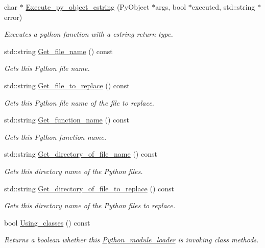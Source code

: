 \begin{DoxyCompactItemize}
char $\ast$ \hyperlink{classjetfuel_1_1inspire_1_1Python__module__loader_a6dcb9763f793360e89da5f3377a945b9}{Execute\+\_\+py\+\_\+object\+\_\+cstring} (Py\+Object $\ast$args, bool $\ast$executed, std\+::string $\ast$error)
\begin{DoxyCompactList}\small\item\em Executes a python function with a cstring return type. \end{DoxyCompactList}\item 
std\+::string \hyperlink{classjetfuel_1_1inspire_1_1Python__module__loader_a2629d9d235cf65a7fe6f44a2554d317c}{Get\+\_\+file\+\_\+name} () const
\begin{DoxyCompactList}\small\item\em Gets this Python file name. \end{DoxyCompactList}\item 
std\+::string \hyperlink{classjetfuel_1_1inspire_1_1Python__module__loader_af687d8cd4118ea0d4449d00161f00043}{Get\+\_\+file\+\_\+to\+\_\+replace} () const
\begin{DoxyCompactList}\small\item\em Gets this Python file name of the file to replace. \end{DoxyCompactList}\item 
std\+::string \hyperlink{classjetfuel_1_1inspire_1_1Python__module__loader_ad2034cdd073b263cecca65e5bb286745}{Get\+\_\+function\+\_\+name} () const
\begin{DoxyCompactList}\small\item\em Gets this Python function name. \end{DoxyCompactList}\item 
std\+::string \hyperlink{classjetfuel_1_1inspire_1_1Python__module__loader_a11defce7f1f1ae5926744d8e0f01243c}{Get\+\_\+directory\+\_\+of\+\_\+file\+\_\+name} () const
\begin{DoxyCompactList}\small\item\em Gets this directory name of the Python files. \end{DoxyCompactList}\item 
std\+::string \hyperlink{classjetfuel_1_1inspire_1_1Python__module__loader_ae908aab386db9d4d5c20c350d1743b5e}{Get\+\_\+directory\+\_\+of\+\_\+file\+\_\+to\+\_\+replace} () const
\begin{DoxyCompactList}\small\item\em Gets this directory name of the Python files to replace. \end{DoxyCompactList}\item 
bool \hyperlink{classjetfuel_1_1inspire_1_1Python__module__loader_a48f19613015ba3e143827a9946e436cd}{Using\+\_\+classes} () const
\begin{DoxyCompactList}\small\item\em Returns a boolean whether this \hyperlink{classjetfuel_1_1inspire_1_1Python__module__loader}{Python\+\_\+module\+\_\+loader} is invoking class methods. \end{DoxyCompactList}\end{DoxyCompactItemize}
